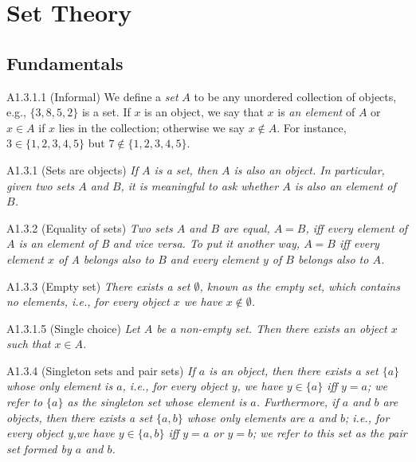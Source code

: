 \section{Set Theory}
\subsection{Fundamentals}
\begin{definition}{A1.3.1.1}
    (Informal) We define a \emph{set} $A$ to be any unordered collection of objects, e.g., $\{3,8,5,2\}$ is a set. If $x$ is an object, we say that $x$ is \emph{an element} of $A$ or $x\in A$ if $x$ lies in the collection; otherwise we say $x\notin A$. For instance, $3\in \{1,2,3,4,5\}$ but $7\notin \{1,2,3,4,5\}$.
\end{definition}
\begin{axiom}{A1.3.1}
    (Sets are objects) \emph{If $A$ is a set, then $A$ is also an object. In particular, given two sets $A$ and $B$, it is meaningful to ask whether $A$ is also an element of $B$.}
\end{axiom}
\begin{axiom}{A1.3.2}
    (Equality of sets) \emph{Two sets $A$ and $B$ are equal, $A=B$, iff every element of $A$ is an element of B and vice versa. To put it another way, $A=B$ iff every element $x$ of A belongs also to $B$ and every element $y$ of $B$ belongs also to $A$.}
\end{axiom}
\begin{axiom}{A1.3.3}
    (Empty set) \emph{There exists a set $\emptyset$, known as the empty set, which contains no elements, i.e., for every object $x$ we have $x\notin \emptyset$.}
\end{axiom}
\begin{lemma}{A1.3.1.5}
    (Single choice) \emph{Let $A$ be a non-empty set. Then there exists an object $x$ such that $x\in A$.}
\end{lemma}

\begin{axiom}{A1.3.4}
    (Singleton sets and pair sets) \emph{If $a$ is an object, then there exists a set $\{a\}$ whose only element is $a$, i.e., for every object $y$, we have $y\in \{a\}$ iff $y=a$; we refer to $\{a\}$ as the singleton set whose element is $a$. Furthermore, if $a$ and $b$ are objects, then there exists a set $\{a,b\}$ whose only elements are $a$ and $b$; i.e., for every object y,we have $y\in \{a,b\}$ iff $y=a$ or $y=b$; we refer to this set as the pair set formed by $a$ and $b$.}
\end{axiom}

